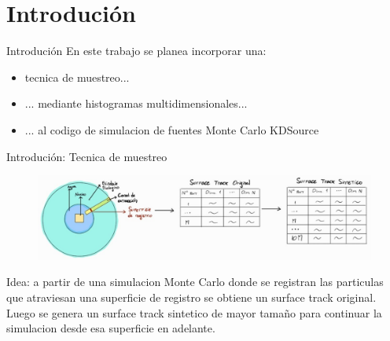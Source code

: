 \documentclass[aspectratio=169,english]{beamer}
\begin{document}








\section{Introdución}
\begin{frame}{Introdución}
    En este trabajo se planea incorporar una:
    \begin{itemize}
        \item tecnica de muestreo...
        \item ... mediante histogramas multidimensionales...
        \item ... al codigo de simulacion de fuentes Monte Carlo KDSource
    \end{itemize}
\end{frame}

\begin{frame}{Introdución: Tecnica de muestreo}
    \begin{figure}
        \centering
        \includegraphics[width=1\linewidth]{imagens/esquema1.jpeg}
        \label{fig:esquema1}
    \end{figure}

    Idea: a partir de una simulacion Monte Carlo donde se registran las particulas que atraviesan una superficie
    de registro se obtiene un surface track original. Luego se genera un surface track sintetico de mayor tamaño 
    para continuar la simulacion desde esa superficie en adelante.
\end{frame}
\end{document}
